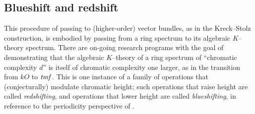 \subsection*{Blueshift and redshift}

This procedure of passing to (higher-order) vector bundles, as in the Kreck--Stolz construction, is embodied by passing from a ring spectrum to its algebraic \(K\)--theory spectrum.  There are on-going research programs with the goal of demonstrating that the algebraic \(K\)--theory of a ring spectrum of ``chromatic complexity \(d\)'' is itself of chromatic complexity one larger, as in the transition from \(kO\) to \(\mathit{tmf}\).  This is one instance of a family of operations that (conjecturally) modulate chromatic height; such operations that raise height are called \textit{redshifting}, and operations that lower height are called \textit{blueshifting}, in reference to the periodicity perspective of .

